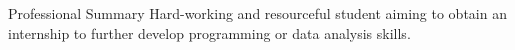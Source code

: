 \begin{rSection}{Professional Summary}
	Hard-working and resourceful student aiming to obtain an internship to further develop programming or data analysis skills.
\end{rSection}
